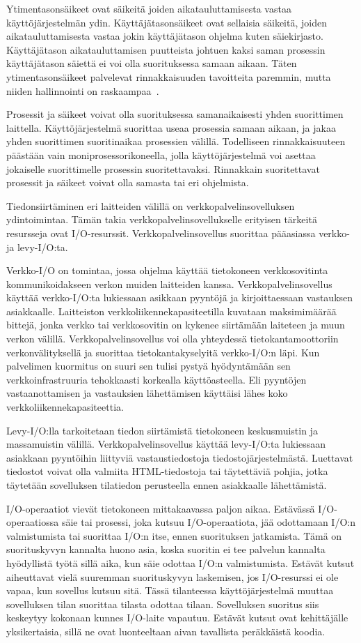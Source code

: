 \documentclass[finnish]{tktltiki2}
\theoremstyle{definition}
\theoremstyle{remark}
\begin{document}
Ytimentasonsäikeet ovat säikeitä joiden aikatauluttamisesta vastaa
käyttöjärjestelmän ydin. Käyttäjätasonsäikeet ovat sellaisia säikeitä,
joiden aikatauluttamisesta vastaa jokin käyttäjätason ohjelma kuten
säiekirjasto. Käyttäjätason aikatauluttamisen puutteista johtuen
kaksi saman prosessin käyttäjätason säiettä ei voi olla suorituksessa
samaan aikaan. Täten ytimentasonsäikeet palvelevat rinnakkaisuuden tavoitteita
paremmin, mutta niiden hallinnointi on raskaampaa~\cite{stallings_operating_2018}.

Prosessit ja säikeet voivat olla suorituksessa samanaikaisesti
yhden suorittimen laittella. Käyttöjärjestelmä suorittaa useaa prosessia
samaan aikaan, ja jakaa yhden suorittimen suoritinaikaa prosessien välillä.
Todelliseen rinnakkaisuuteen päästään vain moniprosessorikoneella, jolla
käyttöjärjestelmä voi asettaa jokaiselle suorittimelle prosessin suoritettavaksi.
Rinnakkain suoritettavat prosessit ja säikeet voivat olla samasta tai
eri ohjelmista.

Tiedonsiirtäminen eri laitteiden välillä on verkkopalvelinsovelluksen
ydintoimintaa.
Tämän takia verkkopalvelinsovellukselle erityisen tärkeitä resursseja ovat
I/O-resurssit.
Verkkopalvelinsovellus suorittaa pääasiassa verkko-ja levy-I/O:ta.

Verkko-I/O on tomintaa, jossa ohjelma käyttää tietokoneen
verkkosovitinta kommunikoidakseen verkon muiden laitteiden kanssa.
Verkkopalvelinsovellus käyttää verkko-I/O:ta lukiessaan
asikkaan pyyntöjä ja kirjoittaessaan vastauksen asiakkaalle.
Laitteiston verkkoliikennekapasiteetilla kuvataan maksimimäärää bittejä,
jonka verkko tai verkkosovitin on kykenee siirtämään laiteteen ja muun
verkon välillä.
Verkkopalvelinsovellus voi olla yhteydessä tietokantamoottoriin
verkonvälityksellä ja suorittaa tietokantakyselyitä verkko-I/O:n läpi.
Kun palvelimen kuormitus on suuri sen tulisi pystyä hyödyntämään
sen verkkoinfrastruuria tehokkaasti korkealla käyttöasteella. Eli
pyyntöjen vastaanottamisen ja vastauksien lähettämisen käyttäisi
lähes koko verkkoliikennekapasiteettia.

Levy-I/O:lla tarkoitetaan tiedon siirtämistä
tietokoneen keskusmuistin ja massamuistin välillä.
Verkkopalvelinsovellus käyttää levy-I/O:ta lukiessaan
asiakkaan pyyntöihin liittyviä vastaustiedostoja tiedostojärjestelmästä.
Luettavat tiedostot voivat olla valmiita HTML-tiedostoja tai täytettäviä
pohjia, jotka täytetään sovelluksen tilatiedon perusteella ennen
asiakkaalle lähettämistä.

I/O-operaatiot vievät tietokoneen mittakaavassa paljon
aikaa. Estävässä I/O-operaatiossa säie tai prosessi,
joka kutsuu I/O-operaatiota, jää odottamaan I/O:n valmistumista
tai suorittaa I/O:n itse,
ennen suorituksen jatkamista. Tämä on suorituskyvyn kannalta huono
asia, koska suoritin ei tee palvelun kannalta hyödyllistä
työtä sillä aika, kun säie odottaa I/O:n valmistumista.
Estävät kutsut aiheuttavat vielä suuremman
suorituskyvyn laskemisen, jos
I/O-resurssi ei ole vapaa, kun sovellus kutsuu sitä.
Tässä tilanteessa käyttöjärjestelmä muuttaa sovelluksen
tilan suorittaa tilasta odottaa tilaan. Sovelluksen suoritus
siis keskeytyy kokonaan kunnes I/O-laite vapautuu.
Estävät kutsut ovat kehittäjälle yksikertaisia, sillä
ne ovat luonteeltaan aivan tavallista peräkkäistä
koodia.
\end{document}

